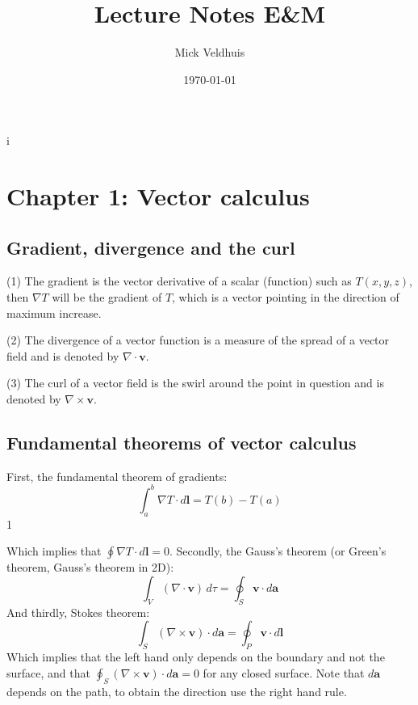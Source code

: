 i\documentclass[a4paper]{article}
\title{Lecture Notes E\&M}
\author{Mick Veldhuis}
\date{\today}
\begin{document}
\maketitle

\tableofcontents

\section{Chapter 1: Vector calculus}

\subsection{Gradient, divergence and the curl}
(1) The gradient is the vector derivative of a scalar (function) such as $T(x, y, z)$, then $\nabla T$ will be the gradient of $T$, which is a vector pointing in the direction of maximum increase.

\bigskip

(2) The divergence of a vector function is a measure of the spread of a vector field and is denoted by $\nabla \cdot \bm{v}$.

\bigskip

(3) The curl of a vector field is the swirl around the point in question and is denoted by $\nabla \times \bm{v}$.

\subsection{Fundamental theorems of vector calculus}
First, the fundamental theorem of gradients:
\begin{equation}
    \int_{a}^{b} \nabla T\cdot d\bm{l} = T(b) - T(a)
\end{equation}1

Which implies that $\oint \nabla T\cdot d\bm{l}=0$. Secondly, the Gauss's theorem (or Green's theorem, Gauss's theorem in 2D):
\begin{equation}
    \int_V (\nabla \cdot \bm{v}) \,d\tau = \oint_S \bm{v} \cdot d\bm{a}
\end{equation}
And thirdly, Stokes theorem:
\begin{equation}
    \int_S (\nabla \times \bm{v}) \cdot d\bm{a} = \oint_P \bm{v}\cdot d\bm{l}
\end{equation}
Which implies that the left hand only depends on the boundary and not the surface, and that $\oint_S (\nabla \times \bm{v}) \cdot d\bm{a}=0$ for any closed surface. Note that $d\bm{a}$ depends on the path, to obtain the direction use the right hand rule.
\end{document}
